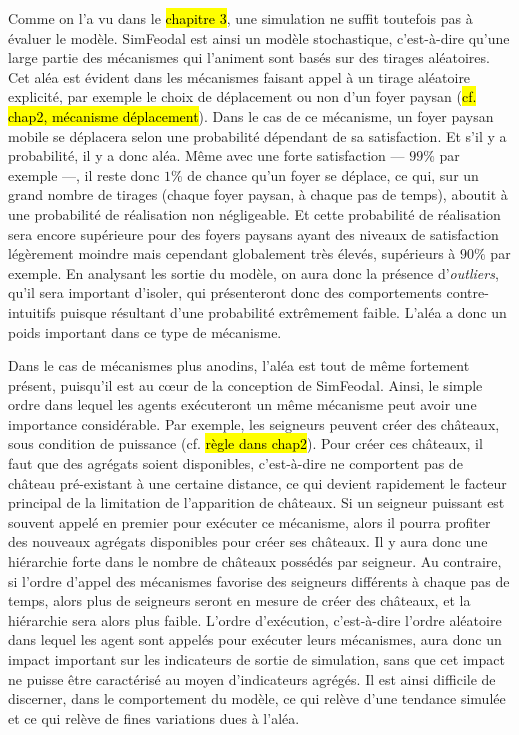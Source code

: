 	Comme on l'a vu dans le \hl{chapitre 3}, une simulation ne suffit toutefois pas à évaluer le modèle.
	SimFeodal est ainsi un modèle stochastique, c'est-à-dire qu'une large partie des mécanismes qui l'animent sont basés sur des tirages aléatoires.
	Cet aléa est évident dans les mécanismes faisant appel à un tirage aléatoire explicité, par exemple le choix de déplacement ou non d'un foyer paysan (\hl{cf. chap2, mécanisme déplacement}).
	Dans le cas de ce mécanisme, un foyer paysan mobile se déplacera selon une probabilité dépendant de sa satisfaction.
	Et s'il y a probabilité, il y a donc aléa.
	Même avec une forte satisfaction --- $99\%$ par exemple ---, il reste donc $1\%$ de chance qu'un foyer se déplace, ce qui, sur un grand nombre de tirages (chaque foyer paysan, à chaque pas de temps), aboutit à une probabilité de réalisation non négligeable.
	Et cette probabilité de réalisation sera encore supérieure pour des foyers paysans ayant des niveaux de satisfaction légèrement moindre mais cependant globalement très élevés, supérieurs à $90\%$ par exemple.
	En analysant les sortie du modèle, on aura donc la présence d'\textit{outliers}, qu'il sera important d'isoler, qui présenteront donc des comportements contre-intuitifs puisque résultant d'une probabilité extrêmement faible.
	L'aléa a donc un poids important dans ce type de mécanisme.

	Dans le cas de mécanismes plus anodins, l'aléa est tout de même fortement présent, puisqu'il est au cœur de la conception de SimFeodal.
	Ainsi, le simple ordre dans lequel les agents exécuteront un même mécanisme peut avoir une importance considérable.
	Par exemple, les seigneurs peuvent créer des châteaux, sous condition de puissance (cf. \hl{règle dans chap2}).
	Pour créer ces châteaux, il faut que des agrégats soient disponibles, c'est-à-dire ne comportent pas de château pré-existant à une certaine distance, ce qui devient rapidement le facteur principal de la limitation de l'apparition de châteaux.
	Si un seigneur puissant est souvent appelé en premier pour exécuter ce mécanisme, alors il pourra profiter des nouveaux agrégats disponibles pour créer ses châteaux. Il y aura donc une hiérarchie forte dans le nombre de châteaux possédés par seigneur.
	Au contraire, si l'ordre d'appel des mécanismes favorise des seigneurs différents à chaque pas de temps, alors plus de seigneurs seront en mesure de créer des châteaux, et la hiérarchie sera alors plus faible.
	L'ordre d'exécution, c'est-à-dire l'ordre aléatoire dans lequel les agent sont appelés pour exécuter leurs mécanismes, aura donc un impact important sur les indicateurs de sortie de simulation, sans que cet impact ne puisse être caractérisé au moyen d'indicateurs agrégés.
	Il est ainsi difficile de discerner, dans le comportement du modèle, ce qui relève d'une tendance simulée et ce qui relève de fines variations dues à l'aléa.

